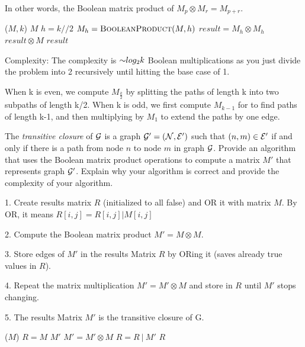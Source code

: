 \begin{problem}
\begin{questions}
In other words, the Boolean matrix product of $M_p \otimes M_r = M_{p+r}$.


\begin{myalgo}{($M, k$)}
    \RETURN $M$
  \ENDIF
  \STATE $h = k//2$
  \STATE $M_h = \textsc{BooleanProduct}(M, h)$
  \STATE $result = M_h \otimes M_h$ 
    \STATE $result \otimes M$ 
  \ENDIF
  \RETURN $result$
\end{myalgo}

Complexity: The complexity is $\mathord{\sim}log_2{k}$ Boolean multiplications as you just divide the problem into 2 recursively until hitting the base case of 1.

When k is even, we compute $M_{\frac{k}{2}}$ by splitting the paths of length k into two subpaths of length k/2. 
When k is odd, we first compute $M_{k-1}$ for to find paths of length k-1, and then multiplying by $M_1$ to extend the paths by one edge.


\item The \emph{transitive closure} of $\mathcal{G}$ is a graph $\mathcal{G}' = (\mathcal{N}, \mathcal{E}')$ such that $(n, m) \in \mathcal{E}'$ if and only if there is a path from node $n$ to node $m$ in graph $\mathcal{G}$. Provide an algorithm that uses the Boolean matrix product operations to compute a matrix $M'$ that represents graph $\mathcal{G}'$. Explain why your algorithm is correct and provide the complexity of your algorithm.

1. Create results matrix $R$ (initialized to all false) and OR it with matrix $M$. By OR, it means $R[i,j] = R[i,j] | M[i,j]$

2. Compute the Boolean matrix product $M' = M \otimes M$.

3. Store edges of $M'$ in the results Matrix $R$ by ORing it (saves already true values in $R$).

4. Repeat the matrix multiplication $M' = M' \otimes M$ and store in $R$ until $M'$ stops changing.

5. The results Matrix $M'$ is the transitive closure of G.


\begin{myalgo}{($M$)}
  \STATE $R = M$
  \STATE $M'$
    \STATE $M' = M' \otimes M$
    \STATE $R = R \:|\: M'$   
  \ENDWHILE
  \RETURN $R$
\end{myalgo}



\end{questions}
\end{problem}
